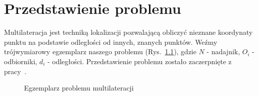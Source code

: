 \chapter{Przedstawienie problemu}\label{chap:problem}

Multilateracja jest techniką lokalizacji pozwalającą obliczyć nieznane koordynaty punktu na podstawie odległości od innych, znanych punktów. Weźmy trójwymiarowy egzemplarz naszego problemu (Rys.~\ref{fig:example}), gdzie $N$ - nadajnik, $O_i$ - odbiorniki, $d_i$ - odległości. Przedstawienie problemu zostało zaczerpnięte z pracy~\cite{norrdine2012algebraic}.

\begin{figure}[!h]
    \centering
    \caption{Egzemplarz problemu multilateracji}
\label{fig:example}
\end{figure}

